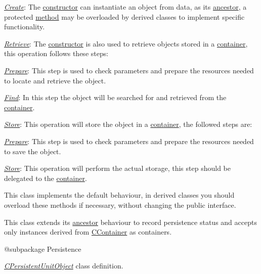 \begin{DoxyItemize}
\item {\itshape \hyperlink{}{Create}}\-: The \hyperlink{}{constructor} can instantiate an object from data, as its \hyperlink{class_c_array_object}{ancestor}, a protected \hyperlink{}{method} may be overloaded by derived classes to implement specific functionality. 
\item {\itshape \hyperlink{}{Retrieve}}\-: The \hyperlink{}{constructor} is also used to retrieve objects stored in a \hyperlink{class_c_container}{container}, this operation follows these steps\-: 
\begin{DoxyItemize}
\item {\itshape \hyperlink{}{Prepare}}\-: This step is used to check parameters and prepare the resources needed to locate and retrieve the object. 
\item {\itshape \hyperlink{}{Find}}\-: In this step the object will be searched for and retrieved from the \hyperlink{class_c_container}{container}. 
\end{DoxyItemize}
\item {\itshape \hyperlink{}{Store}}\-: This operation will store the object in a \hyperlink{class_c_container}{container}, the followed steps are\-: 
\begin{DoxyItemize}
\item {\itshape \hyperlink{}{Prepare}}\-: This step is used to check parameters and prepare the resources needed to save the object. 
\item {\itshape \hyperlink{}{Store}}\-: This operation will perform the actual storage, this step should be delegated to the \hyperlink{class_c_container}{container}. 
\end{DoxyItemize}
\end{DoxyItemize}

This class implements the default behaviour, in derived classes you should overload these methods if necessary, without changing the public interface.

This class extends its \hyperlink{class_c_status_object}{ancestor} behaviour to record persistence status and accepts only instances derived from \hyperlink{class_c_container}{C\-Container} as containers.

\begin{DoxyVerb}    @subpackage     Persistence\end{DoxyVerb}


{\itshape \hyperlink{class_c_persistent_unit_object}{C\-Persistent\-Unit\-Object}} class definition.

